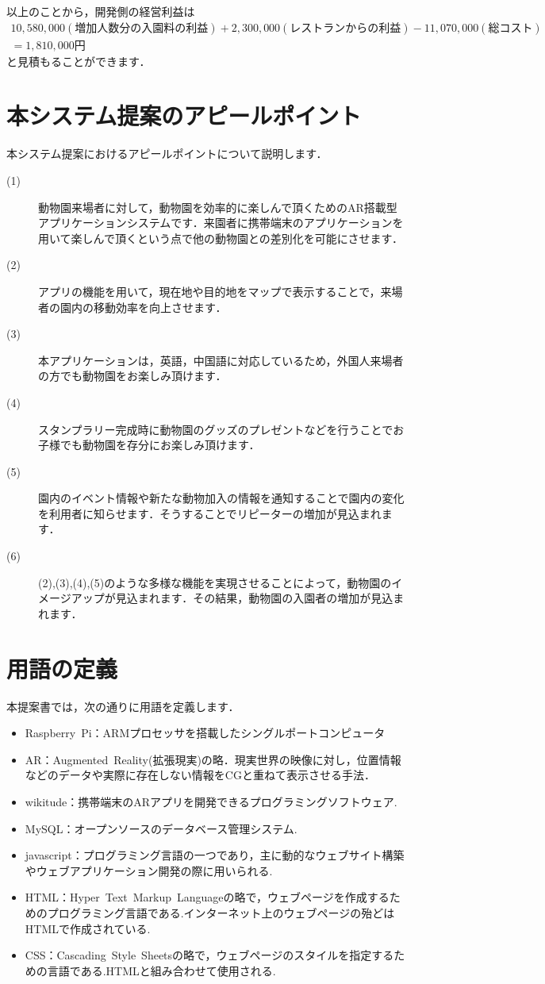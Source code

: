 \documentclass[a4j]{jarticle}
\begin{document}
以上のことから，開発側の経営利益は
\begin{eqnarray*}
10,580,000(増加人数分の入園料の利益)+2,300,000(レストランからの利益)-11,070,000(総コスト)\\
=1,810,000円
\end{eqnarray*}
と見積もることができます．
\section{本システム提案のアピールポイント}
本システム提案におけるアピールポイントについて説明します．
\begin{description}
\item[(1)] 動物園来場者に対して，動物園を効率的に楽しんで頂くためのAR搭載型アプリケーションシステムです．来園者に携帯端末のアプリケーションを用いて楽しんで頂くという点で他の動物園との差別化を可能にさせます．
\item[(2)] アプリの機能を用いて，現在地や目的地をマップで表示することで，来場者の園内の移動効率を向上させます．
\item[(3)] 本アプリケーションは，英語，中国語に対応しているため，外国人来場者の方でも動物園をお楽しみ頂けます．
\item[(4)] スタンプラリー完成時に動物園のグッズのプレゼントなどを行うことでお子様でも動物園を存分にお楽しみ頂けます．
\item[(5)] 園内のイベント情報や新たな動物加入の情報を通知することで園内の変化を利用者に知らせます．そうすることでリピーターの増加が見込まれます．
\item[(6)] (2),(3),(4),(5)のような多様な機能を実現させることによって，動物園のイメージアップが見込まれます．その結果，動物園の入園者の増加が見込まれます．
\end{description}

\section{用語の定義}
  本提案書では，次の通りに用語を定義します．
\begin{itemize}
\item Raspberry~Pi：ARMプロセッサを搭載したシングルポートコンピュータ
\item AR：Augmented~Reality(拡張現実)の略．現実世界の映像に対し，位置情報などのデータや実際に存在しない情報をCGと重ねて表示させる手法．
\item wikitude：携帯端末のARアプリを開発できるプログラミングソフトウェア.
\item MySQL：オープンソースのデータベース管理システム.
\item javascript：プログラミング言語の一つであり，主に動的なウェブサイト構築やウェブアプリケーション開発の際に用いられる.
\item HTML：Hyper~Text~Markup~Languageの略で，ウェブページを作成するためのプログラミング言語である.インターネット上のウェブページの殆どはHTMLで作成されている.
\item CSS：Cascading~Style~Sheetsの略で，ウェブページのスタイルを指定するための言語である.HTMLと組み合わせて使用される.
\end{itemize}
\end{document}
